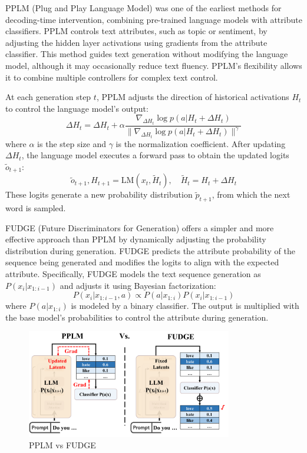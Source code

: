 \documentclass[acmsmall, screen]{acmart}
\begin{document}
PPLM (Plug and Play Language Model) \cite{dathathri_iclr20_PPLM} was one of the earliest methods for decoding-time intervention, combining pre-trained language models with attribute classifiers. PPLM controls text attributes, such as topic or sentiment, by adjusting the hidden layer activations using gradients from the attribute classifier. This method guides text generation without modifying the language model, although it may occasionally reduce text fluency. PPLM's flexibility allows it to combine multiple controllers for complex text control.

At each generation step \( t \), PPLM adjusts the direction of historical activations \( H_t \) to control the language model's output:
\begin{equation}
\Delta H_t = \Delta H_t + \alpha \frac{\nabla_{\Delta H_t} \log p(a|H_t + \Delta H_t)}{\|\nabla_{\Delta H_t} \log p(a|H_t + \Delta H_t)\|^\gamma}
\end{equation}
where \( \alpha \) is the step size and \( \gamma \) is the normalization coefficient. After updating \( \Delta H_t \), the language model executes a forward pass to obtain the updated logits \( \tilde{o}_{t+1} \):
\begin{equation}
\tilde{o}_{t+1}, H_{t+1} = \text{LM}(x_t, \tilde{H}_t), \quad \tilde{H}_t = H_t + \Delta H_t
\end{equation}
These logits generate a new probability distribution \( \tilde{p}_{t+1} \), from which the next word is sampled.

FUDGE (Future Discriminators for Generation) \cite{yang_acl21_fudge} offers a simpler and more effective approach than PPLM by dynamically adjusting the probability distribution during generation. FUDGE predicts the attribute probability of the sequence being generated and modifies the logits to align with the expected attribute. Specifically, FUDGE models the text sequence generation as \(P(x_i|x_{1:i-1})\) and adjusts it using Bayesian factorization:
\[
P(x_i|x_{1:i-1}, a) \propto P(a|x_{1:i})P(x_i|x_{1:i-1})
\]
where \(P(a|x_{1:i})\) is modeled by a binary classifier. The output is multiplied with the base model's probabilities to control the attribute during generation. 

\begin{figure}[h]
    \centering
    \includegraphics[width=0.8\textwidth]{figures/pplm_vs_fudge.pdf}
    \caption{PPLM vs FUDGE}
    \label{fig:pplm_vs_fudge}
\end{figure}
\end{document}
